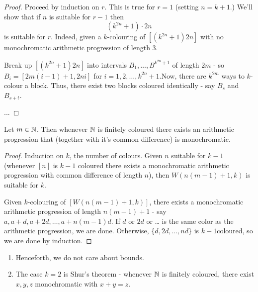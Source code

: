 \begin{proof}
  Proceed by induction on $r$.  This is true for $r = 1$ (setting $n =
  k + 1$.)  We'll show that if $n$ is suitable for $r - 1$ then
  \begin{equation}
    \label{eq:2}
    (k^{2n} + 1) \cdot 2n
  \end{equation} is suitable for $r$.  Indeed, given a $k$-colouring
  of $[(k^{2n} + 1) 2n]$ with no monochromatic arithmetic progression
  of length 3.

  Break up $[(k^{2n} + 1)2n]$ into intervals $B_{1}, \dots, B^{k^{2n}
    + 1}$ of length $2m$ - so $B_{i} = [2m(i-1)  +1, 2ni]$ for $i = 1,
  2, \dots, k^{2n} +1$.Now, there are $k^{2m}$ ways to $k$-colour a
  block. Thus, there exist two blocks coloured identically - say
  $B_{s}$ and $B_{s+t}$.  

  ...
\end{proof}


\begin{thm}
  \label{defn:van_der_waerdens_theorem:3}
  Let $m \in \mathbb{N}$.  Then whenever $\mathbb{N}$ is finitely coloured there
  exists an arithmetic progression that (together with it's common
  difference) is monochromatic.
\end{thm}

\begin{proof}
  Induction on $k$, the number of colours.  Given $n$ suitable for $k
  - 1$ (whenever $[n]$ is $k-1$ coloured there exists a monochromatic
  arithmetic progression with common difference of length $n$), then
  $W(n(m-1) + 1, k)$ is suitable for $k$.

  Given $k$-colouring of $[W(n(m-1) + 1, k)]$, there exists a
  monochromatic arithmetic progression of length $n(m-1) + 1$ - say
  $a, a + d, a + 2d, \dots, a + n(m-1)d$. If $d$ or $2d$ or \dots{} is
  the same color as the arithmetic progression, we are done.
  Otherwise, $\{ d, 2d, \dots, nd \}$ is $k-1$coloured, so we are done
  by induction.
\end{proof}

\begin{remark}
  \begin{enumerate}
  \item Henceforth, we do not care about bounds.
  \item The case $k = 2$ is Shur's theorem - whenever $\mathbb{N}$ is finitely
    coloured, there exist $x, y, z$ monochromatic with $x + y = z$.
  \end{enumerate}
\end{remark}

